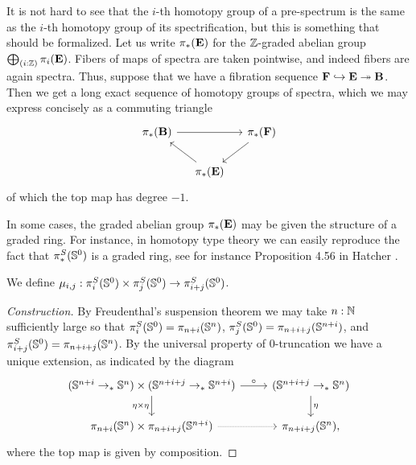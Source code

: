 \documentclass[reqno]{amsart}
\begin{document}
It is not hard to see that the $i$-th homotopy group of a pre-spectrum is the same as the $i$-th homotopy group of its spectrification, but this is something that should be formalized. Let us write $\pi_\ast(\mathbf{E})$ for the $\mathbb{Z}$-graded abelian group $\bigoplus_{(i:\mathbb{Z})}\pi_i(\mathbf{E})$. Fibers of maps of spectra are taken pointwise, and indeed fibers are again spectra. Thus, suppose that we have a fibration sequence $\mathbf{F}\hookrightarrow\mathbf{E}\twoheadrightarrow\mathbf{B}$. Then we get a long exact sequence of homotopy groups of spectra, which we may express concisely as a commuting triangle
\begin{equation*}
\begin{tikzcd}[column sep=small]
\pi_\ast(\spectrum{B}) \arrow[rr] & & \pi_\ast(\spectrum{F}) \arrow[dl] \\
& \pi_\ast(\spectrum{E}) \arrow[ul]
\end{tikzcd}
\end{equation*}
of which the top map has degree $-1$.

In some cases, the graded abelian group $\pi_\ast(\mathbf{E})$ may be given the structure of a graded ring. 
For instance, in homotopy type theory we can easily reproduce the fact that $\pi_\ast^S(\mathbb{S}^{0})$ is a graded ring, see for instance Proposition 4.56 in Hatcher \cite{HatcherAT}.

\begin{defn}
We define $\mu_{i,j} : \pi_i^S(\mathbb{S}^{0})\times\pi_j^S(\mathbb{S}^{0})\to\pi_{i+j}^S(\mathbb{S}^{0})$. 
\end{defn}

\begin{proof}[Construction]
By Freudenthal's suspension theorem we may take $n:\mathbb{N}$ sufficiently large 
so that $\pi_i^S(\mathbb{S}^{0})=\pi_{n+i}(\mathbb{S}^{n})$, $\pi_j^S(\mathbb{S}^{0})=\pi_{n+i+j}(\mathbb{S}^{n+i})$, and $\pi_{i+j}^S(\mathbb{S}^{0})=\pi_{n+i+j}(\mathbb{S}^{n})$. By the universal property of $0$-truncation we
have a unique extension, as indicated by the diagram
\begin{equation*}
\begin{tikzcd}
(\sphere{n+i}\to_\ast\sphere{n})\times(\sphere{n+i+j}\to_\ast\sphere{n+i}) \arrow[r,"\circ"] \arrow[d,swap,"\eta\times\eta"] & (\sphere{n+i+j}\to_\ast\sphere{n}) \arrow[d,"\eta"] \\
\pi_{n+i}(\sphere{n})\times\pi_{n+i+j}(\sphere{n+i}) \arrow[r,densely dotted] & \pi_{n+i+j}(\sphere{n}),
\end{tikzcd}
\end{equation*}
where the top map is given by composition.
\end{proof}
\end{document}

